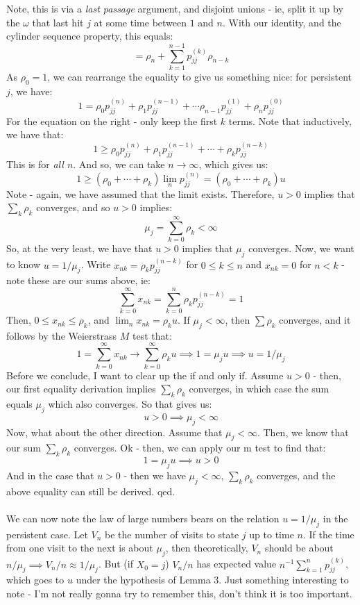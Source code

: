 \documentclass[12pt,a4paper]{article}
\newcommand{\1}[1]{\mathbbm{1}\left\{ #1 \right\}}
\begin{document}
Note, this is via a \textit{last passage} argument, and disjoint unions - ie, split it up by the $\omega$ that last hit $j$ at some time between $1$ and $n$. With our identity, and the cylinder sequence property, this equals:
$$
	= \rho_n + \sum_{k=1}^{n-1} p_{jj}^{(k)} \rho_{n-k}
$$
As $\rho_0 = 1$, we can rearrange the equality to give us something nice: for persistent $j$, we have:
$$
	1 = \rho_0 p_{jj}^{(n)} + \rho_1 p_{jj}^{(n-1)} + \cdots \rho_{n-1} p_{jj}^{(1)} + \rho_n p_{jj}^{(0)}
$$
For the equation on the right - only keep the first $k$ terms. Note that inductively, we have that:
$$
	1 \geq \rho_0 p_{jj}^{(n)} + \rho_1 p_{jj}^{(n-1)} + \cdots + \rho_k p_{jj}^{(n-k)}
$$
This is for \textit{all $n$}. And so, we can take $n \to \infty$, which gives us:
$$
	1 \geq (\rho_0 + \cdots + \rho_k)\lim_{n} p_{jj}^{(n)} = (\rho_0 + \cdots + \rho_k) u
$$
Note - again, we have assumed that the limit exists. Therefore, $u > 0$ implies that $\sum_k \rho_k$ converges, and so $u > 0$ implies:
$$
	\mu_j = \sum_{k = 0}^\infty \rho_k < \infty
$$
So, at the very least, we have that $u > 0$ implies that $\mu_j$ converges. Now, we want to know $u = 1/\mu_j$. Write $x_{nk} = \rho_k p_{jj}^{(n-k)}$ for $0 \leq k \leq n$ and $x_{nk} = 0$ for $n < k$ - note these are our sums above, ie:
$$
	\sum_{k=0}^\infty x_{nk} = \sum_{k=0}^n \rho_k p_{jj}^{(n-k)} = 1
$$
Then, $0 \leq x_{nk} \leq \rho_k$, and $\lim_n x_{nk} = \rho_k u$. If $\mu_j < \infty$, then $\sum \rho_k$ converges, and it follows by the Weierstrass $M$ test that:
$$
	1 = \sum_{k=0}^\infty x_{nk} \to \sum_{k=0}^\infty \rho_k u \implies
	1 = \mu_j u \implies u = 1/\mu_j
$$
Before we conclude, I want to clear up the if and only if. Assume $u > 0$ - then, our first equality derivation implies $\sum_k \rho_k$ converges, in which case the sum equals $\mu_j$ which also converges. So that gives us:
$$
	u > 0 \implies \mu_j < \infty
$$
Now, what about the other direction. Assume that $\mu_j < \infty$. Then, we know that our sum $\sum_k \rho_k$ converges. Ok - then, we can apply our m test to find that:
$$
	1 = \mu_j u \implies u > 0
$$
And in the case that $u > 0$ - then we have $\mu_j < \infty$, $\sum_k \rho_k$ converges, and the above equality can still be derived. qed.
\\\\
We can now note the law of large numbers bears on the relation $u = 1/\mu_j$ in the persistent case. Let $V_n$ be the number of visits to state $j$ up to time $n$. If the time from one visit to the next is about $\mu_j$, then theoretically, $V_n$ should be about $n/\mu_j \implies V_n/n \approx 1/\mu_j$. But (if $X_0 = j$) $V_n/n$ has expected value $n^{-1}\sum_{k=1}^n p_{jj}^{(k)}$, which goes to $u$ under the hypothesis of Lemma 3. Just something interesting to note - I'm not really gonna try to remember this, don't think it is too important.
\end{document}
